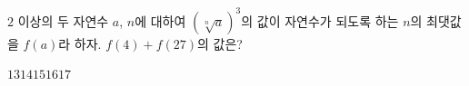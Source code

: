 $2$ 이상의 두 자연수 $a$, $n$에 대하여 $(\sqrt[n]{a})^3$의 값이 자연수가 되도록 하는 $n$의 최댓값을 $f(a)$라 하자. $f(4)+f(27)$의 값은?
\begin{choices32}{$13$}{$14$}{$15$}{$16$}{$17$}\end{choices32}
